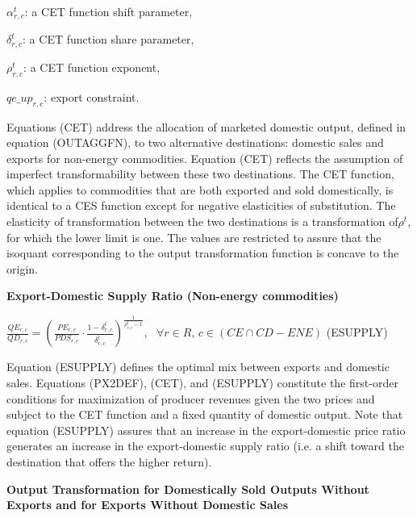 \documentclass[10pt,a4paper,titlepage,dvipdfmx]{book}
\begin{document}
\begin{flushleft}
$\alpha _{r,c}^{t}$: a CET function shift parameter,

$\delta _{r,c}^{t}$: a CET function share parameter,

$\rho _{r,c}^{t}$: a CET function exponent,

$qe\_up_{r,c}$: export constraint.
\end{flushleft}

Equations (CET) address the allocation of marketed domestic output, defined in equation (OUTAGGFN), to two alternative destinations: domestic sales and exports for non-energy commodities. Equation (CET) reflects the assumption of imperfect transformability between these two destinations. The CET function, which applies to commodities that are both exported and sold domestically, is identical to a CES function except for negative elasticities of substitution. The elasticity of transformation between the two destinations is a transformation of$\rho ^{t}$, for which the lower limit is one. The values are restricted to assure that the isoquant corresponding to the output transformation function is concave to the origin.

\begin{flushleft}\textbf{Export-Domestic Supply Ratio (Non-energy commodities)}\end{flushleft}


\begin{center}$\frac{QE_{r,c}}{QD_{r,c}}=\left(\frac{PE_{r,c}}{PDS_{r,c}}\cdot \frac{1-\delta _{r,c}^{t}}{\delta _{r,c}^{t}}\right)^{\frac{1}{\rho _{r,c}^{t}-1}},\,\,\,\,\forall r\in R,\,c\in \left(CE\cap CD-ENE\right)$ (ESUPPLY)
\end{center}

Equation (ESUPPLY) defines the optimal mix between exports and domestic sales. Equations (PX2DEF), (CET), and (ESUPPLY) constitute the first-order conditions for maximization of producer revenues given the two prices and subject to the CET function and a fixed quantity of domestic output. Note that equation (ESUPPLY) assures that an increase in the export-domestic price ratio generates an increase in the export-domestic supply ratio (i.e. a shift toward the destination that offers the higher return).

\begin{flushleft}\textbf{Output Transformation for Domestically Sold Outputs Without Exports and for Exports Without Domestic Sales}\end{flushleft}
\end{document}

